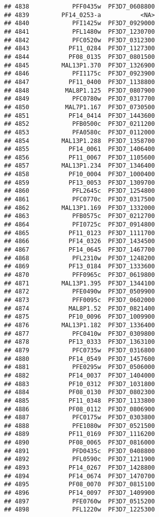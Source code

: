 \documentclass{article}\usepackage[]{graphicx}\usepackage[]{color}
\makeatletter
\newenvironment{kframe}{%
 \def\at@end@of@kframe{}%
 \ifinner\ifhmode%
  \def\at@end@of@kframe{\end{minipage}}%
  \begin{minipage}{\columnwidth}%
 \fi\fi%
 \def\FrameCommand##1{\hskip\@totalleftmargin \hskip-\fboxsep
 \colorbox{shadecolor}{##1}\hskip-\fboxsep
     \hskip-\linewidth \hskip-\@totalleftmargin \hskip\columnwidth}%
 \MakeFramed {\advance\hsize-\width
   \@totalleftmargin\z@ \linewidth\hsize
   \@setminipage}}%
 {\par\unskip\endMakeFramed%
 \at@end@of@kframe}
\newenvironment{knitrout}{}{} %
\makeatother
\begin{document}
\begin{knitrout}
\begin{kframe}
\begin{verbatim}
## 4838            PFF0435w  PF3D7_0608800
## 4839         PF14_0253-a           <NA>
## 4840            PFI1425w  PF3D7_0929000
## 4841            PFL1480w  PF3D7_1230700
## 4842            PFC0520w  PF3D7_0312300
## 4843           PF11_0284  PF3D7_1127300
## 4844           PF08_0135  PF3D7_0801500
## 4845         MAL13P1.370  PF3D7_1326900
## 4846            PFI1175c  PF3D7_0923900
## 4847           PF11_0400  PF3D7_1138800
## 4848          MAL8P1.125  PF3D7_0807900
## 4849            PFC0780w  PF3D7_0317700
## 4850          MAL7P1.167  PF3D7_0730500
## 4851           PF14_0414  PF3D7_1443600
## 4852            PFB0500c  PF3D7_0211200
## 4853            PFA0580c  PF3D7_0112000
## 4854         MAL13P1.288  PF3D7_1358700
## 4855           PF14_0061  PF3D7_1406400
## 4856           PF11_0067  PF3D7_1105600
## 4857         MAL13P1.234  PF3D7_1346400
## 4858           PF10_0004  PF3D7_1000400
## 4859           PF13_0053  PF3D7_1309700
## 4860            PFL2645c  PF3D7_1254800
## 4861            PFC0770c  PF3D7_0317500
## 4862         MAL13P1.169  PF3D7_1332000
## 4863            PFB0575c  PF3D7_0212700
## 4864            PFI0725c  PF3D7_0914800
## 4865           PF11_0123  PF3D7_1111700
## 4866           PF14_0326  PF3D7_1434500
## 4867           PF14_0645  PF3D7_1467700
## 4868            PFL2310w  PF3D7_1248200
## 4869           PF13_0184  PF3D7_1333600
## 4870            PFF0965c  PF3D7_0619800
## 4871         MAL13P1.395  PF3D7_1344100
## 4872            PFE0490w  PF3D7_0509900
## 4873            PFF0095c  PF3D7_0602000
## 4874           MAL8P1.52  PF3D7_0821400
## 4875           PF10_0096  PF3D7_1009900
## 4876         MAL13P1.182  PF3D7_1336400
## 4877            PFC0410w  PF3D7_0309800
## 4878           PF13_0333  PF3D7_1363100
## 4879            PFC0735w  PF3D7_0316800
## 4880           PF14_0549  PF3D7_1457600
## 4881            PFE0295w  PF3D7_0506000
## 4882           PF14_0037  PF3D7_1404000
## 4883           PF10_0312  PF3D7_1031800
## 4884           PF08_0130  PF3D7_0802300
## 4885           PF11_0348  PF3D7_1133800
## 4886           PF08_0112  PF3D7_0806900
## 4887            PFC0175w  PF3D7_0303800
## 4888            PFE1080w  PF3D7_0521500
## 4889           PF11_0169  PF3D7_1116200
## 4890           PF08_0065  PF3D7_0816000
## 4891            PFD0435c  PF3D7_0408800
## 4892            PFL0590c  PF3D7_1211900
## 4893           PF14_0267  PF3D7_1428800
## 4894           PF14_0674  PF3D7_1470700
## 4895           PF08_0070  PF3D7_0815100
## 4896           PF14_0097  PF3D7_1409900
## 4897            PFE0760w  PF3D7_0515200
## 4898            PFL1220w  PF3D7_1225300

\end{verbatim}
\end{kframe}
\end{knitrout}
\end{document}
